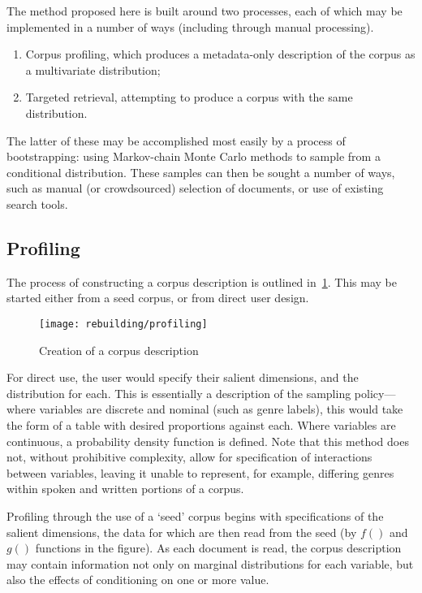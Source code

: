 
The method proposed here is built around two processes, each of which may be implemented in a number of ways (including through manual processing).

\begin{enumerate}
    \item Corpus profiling, which produces a metadata-only description of the corpus as a multivariate distribution;
    \item Targeted retrieval, attempting to produce a corpus with the same distribution.
\end{enumerate}

The latter of these may be accomplished most easily by a process of bootstrapping: using Markov-chain Monte Carlo methods to sample from a conditional distribution.  These samples can then be sought a number of ways, such as manual (or crowdsourced) selection of documents, or use of existing search tools.

\subsection{Profiling}
The process of constructing a corpus description is outlined in~\ref{fig:rebuilding:profiling}.  This may be started either from a seed corpus, or from direct user design.

\begin{figure}[h]
    \centering
    \texttt{[image: rebuilding/profiling]}
    \caption{Creation of a corpus description}
    \label{fig:rebuilding:profiling}
\end{figure}


For direct use, the user would specify their salient dimensions, and the distribution for each.  This is essentially a description of the sampling policy---where variables are discrete and nominal (such as genre labels), this would take the form of a table with desired proportions against each.  Where variables are continuous, a probability density function is defined.  Note that this method does not, without prohibitive complexity, allow for specification of interactions between variables, leaving it unable to represent, for example, differing genres within spoken and written portions of a corpus.

Profiling through the use of a `seed' corpus begins with specifications of the salient dimensions, the data for which are then read from the seed (by $f()$ and $g()$ functions in the figure).  As each document is read, the corpus description may contain information not only on marginal distributions for each variable, but also the effects of conditioning on one or more value.

